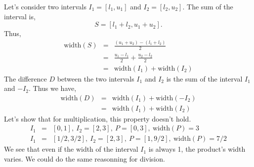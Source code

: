 \documentclass[a4paper,12pt]{article}
\begin{document}
Let's consider two intervals $I_1 = [l_1, u_1]$ and $ I_2 = [l_2,
  u_2]$.  The sum of the interval is,
\[ S = [l_1+l_2, u_1+u_2].\]
Thus,
\begin{eqnarray*}
\mathrm{width}(S) &=& \frac{(u_1+u_2) - (l_1+l_2)}{2} \\
&=& \frac{u_1-l_1}{2} + \frac{u_2-l_2}{2} \\
&=& \mathrm{width}(I_1) + \mathrm{width}(I_2)
\end{eqnarray*}
The difference $D$ between the two intervals $I_1$ and $I_2$ is the
sum of the interval $I_1$ and $-I_2$.  Thus we have,
\begin{eqnarray*}
\mathrm{width}(D) &=& \mathrm{width}(I_1) + \mathrm{width}(-I_2) \\
&=& \mathrm{width}(I_1) + \mathrm{width}(I_2)
\end{eqnarray*}
Let's show that for multiplication, this property doesn't hold.
\begin{eqnarray*}
I_1 &=& [0, 1],\ I_2 = [2, 3],\ P = [0, 3],\ \mathrm{width}(P) = 3 \\
I_1 &=& [1/2, 3/2],\ I_2 = [2, 3],\ P = [1, 9/2],\ \mathrm{width}(P) =
7/2
\end{eqnarray*}
We see that even if the width of the interval $I_1$ is always 1, the
product's width varies.  We could do the same reasonning for division.
\end{document}
